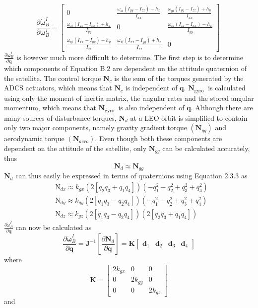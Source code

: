 $$
\frac{\partial \dot{\boldsymbol{\omega}}_{B}^{I}}{\partial \boldsymbol{\omega}_{B}^{I}}=\left[\begin{array}{ccc}
0 & \frac{\omega_{z i}\left(I_{y y}-I_{z z}\right)-h_{z}}{I_{x x}} & \frac{\omega_{y i}\left(I_{y y}-I_{z z}\right)+h_{y}}{I_{x x}} \\
\frac{\omega_{z i}\left(I_{z z}-I_{x x}\right)+h_{z}}{I_{y y}} & 0 & \frac{\omega_{x i}\left(I_{z z}-I_{x x}\right)-h_{x}}{I_{y y}} \\
\frac{\omega_{y i}\left(I_{x x}-I_{y y}\right)-h_{y}}{I_{z z}} & \frac{\omega_{x i}\left(I_{x x}-I_{y y}\right)+h_{x}}{I_{z z}} & 0
\end{array}\right] .
$$
$\frac{\partial \dot{\boldsymbol{\omega}}_{B}^{I}}{\partial \mathbf{q}}$ is however much more difficult to determine. The first step is to determine which components of Equation B.2 are dependent on the attitude quaternion of the satellite. The control torque $\mathbf{N}_{c}$ is the sum of the torques generated by the ADCS actuators, which means that $\mathbf{N}_{c}$ is independent of $\mathbf{q}$. $\mathbf{N}_{\text {gyro }}$ is calculated using only the moment of inertia matrix, the angular rates and the stored angular momentum, which means that $\mathbf{N}_{\text {gyro }}$ is also independent of $\mathbf{q}$. Although there are many sources of disturbance torques, $\mathbf{N}_{d}$ at a LEO orbit is simplified to contain only two major components, namely gravity gradient torque $\left(\mathbf{N}_{g g}\right)$ and aerodynamic torque $\left(\mathbf{N}_{a e r o}\right)$. Even though both these components are dependent on the attitude of the satellite, only $\mathbf{N}_{g g}$ can be calculated accurately, thus
$$
\mathbf{N}_{d} \approx \mathbf{N}_{g g}
$$
$\mathbf{N}_{d}$ can thus easily be expressed in terms of quaternions using Equation $2.3 .3$ as
$$
\begin{aligned}
&\mathrm{N}_{d x} \approx k_{g x}\left(2\left[q_{2} q_{3}+q_{1} q_{4}\right]\right)\left(-q_{1}^{2}-q_{2}^{2}+q_{3}^{2}+q_{4}^{2}\right) \\
&\mathrm{N}_{d y} \approx k_{g y}\left(2\left[q_{1} q_{3}-q_{2} q_{4}\right]\right)\left(-q_{1}^{2}-q_{2}^{2}+q_{3}^{2}+q_{4}^{2}\right) \\
&\mathrm{N}_{d z} \approx k_{g z}\left(2\left[q_{1} q_{3}-q_{2} q_{4}\right]\right)\left(2\left[q_{2} q_{3}+q_{1} q_{4}\right]\right)
\end{aligned}
$$
$\frac{\partial \dot{\omega}_{B}^{I}}{\partial \mathbf{q}}$ can now be calculated as
$$
\frac{\partial \dot{\boldsymbol{\omega}}_{B}^{I}}{\partial \mathbf{q}}=\mathbf{J}^{-1}\left[\frac{\partial \mathbf{N}_{d}}{\partial \mathbf{q}}\right]=\mathbf{K}\left[\begin{array}{llll}
\mathbf{d}_{1} & \mathbf{d}_{2} & \mathbf{d}_{3} & \mathbf{d}_{4}
\end{array}\right]
$$
where
$$
\mathbf{K}=\left[\begin{array}{ccc}
2 k_{g x} & 0 & 0 \\
0 & 2 k_{g y} & 0 \\
0 & 0 & 2 k_{g z}
\end{array}\right]
$$
and

